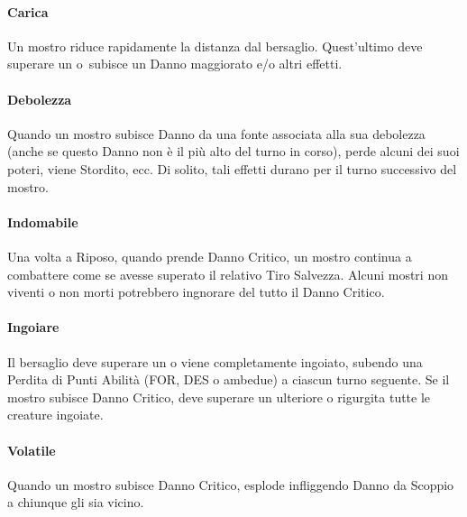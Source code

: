 \documentclass[itdr]{subfiles}
\begin{document}
\vfill
\paragraph{Carica}
Un mostro riduce rapidamente la distanza dal bersaglio. Quest'ultimo deve superare un  o~subisce un Danno maggiorato e/o altri effetti.

\vfill
\paragraph{Debolezza}
Quando un mostro subisce Danno da una fonte associata alla sua debolezza (anche se questo Danno non è il più alto del turno in corso), perde alcuni dei suoi poteri, viene Stordito, ecc. Di solito, tali effetti durano per il turno successivo del mostro.

\vfill
\paragraph{Indomabile}
Una volta a Riposo, quando prende Danno Critico, un mostro continua a combattere come se avesse superato il relativo Tiro Salvezza. Alcuni mostri non viventi o non morti potrebbero ingnorare del tutto il Danno Critico.

\vfill
\paragraph{Ingoiare}
Il bersaglio deve superare un  o viene completamente ingoiato, subendo una Perdita di Punti Abilità (FOR, DES o ambedue) a ciascun turno seguente. Se il mostro subisce Danno Critico, deve superare un ulteriore  o rigurgita tutte le creature ingoiate.

\vfill
\paragraph{Volatile}
Quando un mostro subisce Danno Critico, esplode infliggendo Danno da Scoppio a chiunque gli sia vicino.

\vfill
\end{document}
